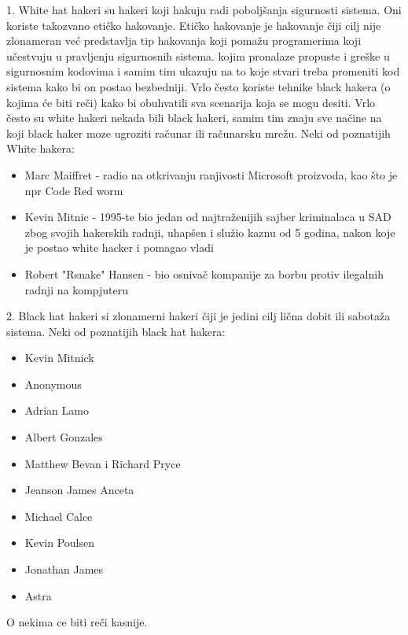 \documentclass[a4paper]{article}
\begin{document}
\label{subsec:podnaslov1}
1. White hat hakeri su hakeri koji hakuju radi poboljšanja sigurnosti sistema. Oni koriste takozvano etičko hakovanje. Etičko hakovanje je hakovanje čiji cilj nije zlonameran već predstavlja tip hakovanja koji pomažu programerima koji učestvuju u pravljenju sigurnosnih sistema. kojim pronalaze propuste i greške u sigurnosnim kodovima i samim tim ukazuju na to koje stvari treba promeniti kod sistema kako bi on postao bezbedniji. Vrlo često koriste tehnike black hakera (o kojima će biti reči) kako bi obuhvatili sva scenarija koja se mogu desiti. Vrlo često su white hakeri nekada bili black hakeri, samim tim znaju sve načine na koji black haker moze ugroziti računar ili računarsku mrežu.
\newline
\newline
Neki od poznatijih White hakera:
\begin{itemize}
	\item Marc Maiffret - radio na otkrivanju ranjivosti Microsoft proizvoda, kao što je npr Code Red worm
	\item Kevin Mitnic - 1995-te bio jedan od najtraženijih sajber kriminalaca u SAD zbog svojih hakerskih radnji, uhapšen i služio kaznu od 5 godina, nakon koje je postao white hacker i pomagao vladi
	\item Robert "Rsnake" Hansen - bio osnivač kompanije za borbu protiv ilegalnih radnji na kompjuteru
\end{itemize}
\newline


\label{subsec:podnaslov2}
2. Black hat hakeri si zlonamerni hakeri čiji je jedini cilj lična dobit ili sabotaža sistema.
\newline
Neki od poznatijih black hat hakera:
\begin{itemize}
	\item Kevin Mitnick
	\item Anonymous
	\item Adrian Lamo
	\item Albert Gonzales
	\item Matthew Bevan i Richard Pryce
	\item Jeanson James Anceta
	\item Michael Calce
	\item Kevin Poulsen
	\item Jonathan James
	\item Astra
\end{itemize}
O nekima ce biti reči kasnije.
\newline
\end{document}

